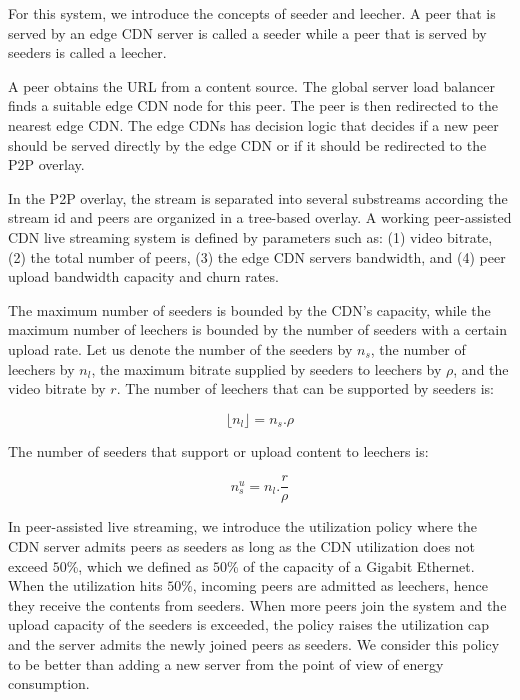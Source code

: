 For this system, we introduce the concepts of seeder and leecher. 
A peer that is served by an edge CDN server is called a seeder while a peer that is served by seeders is called a leecher.

A peer obtains the URL from a content source.  
The global server load balancer finds a suitable edge CDN node for this peer. 
The peer is then redirected to the nearest edge CDN. 
The edge CDNs has decision logic that decides if a new peer should be served directly by the edge CDN or if it should be redirected to the P2P overlay.

In the P2P overlay, the stream is separated into several substreams according the stream id and peers are organized in a tree-based overlay. 
A working peer-assisted CDN live streaming system is defined by parameters such as: (1) video bitrate, (2) the total number of peers, (3) the edge CDN servers bandwidth, and (4) peer upload bandwidth capacity and churn rates. 

The maximum number of seeders is bounded by the CDN's capacity, while the maximum number of leechers is bounded by the number of seeders with a certain upload rate.
Let us denote the number of the seeders by $n_s$, the number of leechers by $n_l$, the maximum bitrate supplied by seeders to leechers by $\rho$, and the video bitrate by $r$. 
The number of leechers that can be supported by seeders is:

\begin{equation}\label{eqn:leecher}
	\lfloor n_l \rfloor = n_s . \rho
\end{equation}

The number of seeders that support or upload content to leechers is:

\begin{equation}\label{eqn:seeders-to-leechers}
	n_{s}^{u} = n_l . \frac{r}{\rho}
\end{equation}

In peer-assisted live streaming, we introduce the utilization policy where the CDN server admits peers as seeders as long as the CDN utilization does not exceed $50$\%, which we defined as $50$\% of the capacity of a Gigabit Ethernet. 
When the utilization hits $50$\%, incoming peers are admitted as leechers, hence they receive the contents from seeders. 
When more peers join the system and the upload capacity of the seeders is exceeded, the policy raises the utilization cap and the server admits the newly joined peers as seeders. 
We consider this policy to be better than adding a new server from the point of view of energy consumption.

